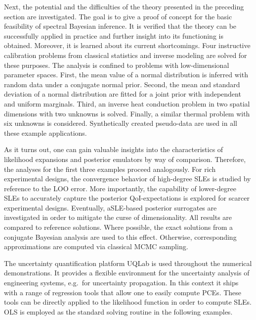 Next, the potential and the difficulties of the theory presented in the preceding section are investigated.
The goal is to give a proof of concept for the basic feasibility of spectral Bayesian inference.
It is verified that the theory can be successfully applied in practice and further insight into its functioning is obtained.
Moreover, it is learned about its current shortcomings.
Four instructive calibration problems from classical statistics and inverse modeling are solved for these purposes.
The analysis is confined to problems with low-dimensional parameter spaces.
First, the mean value of a normal distribution is inferred with random data under a conjugate normal prior.
Second, the mean and standard deviation of a normal distribution are fitted for a joint prior with independent and uniform marginals.
Third, an inverse heat conduction problem in two spatial dimensions with two unknowns is solved.
Finally, a similar thermal problem with six unknowns is considered.
Synthetically created pseudo-data are used in all these example applications.
\par %
As it turns out, one can gain valuable insights into the characteristics of likelihood expansions and posterior emulators by way of comparison.
Therefore, the analyses for the first three examples proceed analogously.
For rich experimental designs, the convergence behavior of high-degree SLEs is studied by reference to the LOO error.
More importantly, the capability of lower-degree SLEs to accurately capture the posterior QoI-expectations is explored for scarcer experimental designs.
Eventually, aSLE-based posterior surrogates are investigated in order to mitigate the curse of dimensionality.
All results are compared to reference solutions.
Where possible, the exact solutions from a conjugate Bayesian analysis are used to this effect.
Otherwise, corresponding approximations are computed via classical MCMC sampling.
\par %
The uncertainty quantification platform UQLab \cite{Computing:Marelli2014:Proc,Computing:Uqlab2015:Manual09104} is used throughout the numerical demonstrations.
It provides a flexible environment for the uncertainty analysis of engineering systems, e.g.\ for uncertainty propagation.
In this context it ships with a range of regression tools that allow one to easily compute PCEs.
These tools can be directly applied to the likelihood function in order to compute SLEs.
OLS is employed as the standard solving routine in the following examples.

